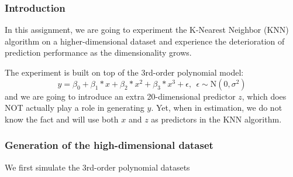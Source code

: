 \documentclass[11pt]{article}
\begin{document}
\hypertarget{introduction}{%
\subsubsection{Introduction}\label{introduction}}

In this assignment, we are going to experiment the K-Nearest Neighbor
(KNN) algorithm on a higher-dimensional dataset and experience the
deterioration of prediction performance as the dimensionality grows.

The experiment is built on top of the 3rd-order polynomial model:
\[y = \beta_0 + \beta_1 * x + \beta_2 * x^2 + \beta_3 * x^3 + \epsilon, ~~ \epsilon \sim \text{N}(0, \sigma^2)\]
and we are going to introduce an extra 20-dimensional predictor \(z\),
which does NOT actually play a role in generating \(y\). Yet, when in
estimation, we do not know the fact and will use both \(x\) and \(z\) as
predictors in the KNN algorithm.

\hypertarget{generation-of-the-high-dimensional-dataset}{%
\subsubsection{Generation of the high-dimensional
dataset}\label{generation-of-the-high-dimensional-dataset}}

We first simulate the 3rd-order polynomial datasets
\end{document}

